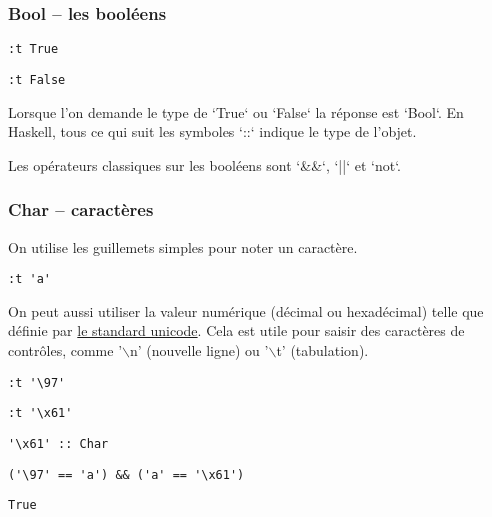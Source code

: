 \documentclass[11pt]{article}
\begin{document}
\subsubsection{Bool -- les booléens}
\label{sec:org04e34d8}
\begin{verbatim}
:t True
\end{verbatim}

\begin{verbatim}
:t False 
\end{verbatim}

Lorsque l'on demande  le type de `True` ou `False`  la réponse est `Bool`.   En Haskell, tous ce qui suit les symboles `::` indique le type de l'objet.

Les opérateurs classiques sur les booléens sont `\&\&`, `||` et `not`.

\subsubsection{Char -- caractères}
\label{sec:org65c8a28}
On utilise les guillemets simples pour noter un caractère.
\begin{verbatim}
:t 'a'
\end{verbatim}

On peut aussi utiliser la valeur numérique (décimal ou hexadécimal) telle que définie par \href{https://en.wikipedia.org/wiki/List\_of\_Unicode\_characters\#Latin\_script}{le standard unicode}.   Cela est utile pour saisir des caractères de contrôles, comme '$\backslash{}$n' (nouvelle ligne) ou '$\backslash{}$t' (tabulation).



\begin{verbatim}
:t '\97'
\end{verbatim}
\begin{verbatim}
:t '\x61'
\end{verbatim}
\begin{verbatim}
'\x61' :: Char
\end{verbatim}


\begin{verbatim}
('\97' == 'a') && ('a' == '\x61')
\end{verbatim}
\begin{verbatim}
True
\end{verbatim}
\end{document}

